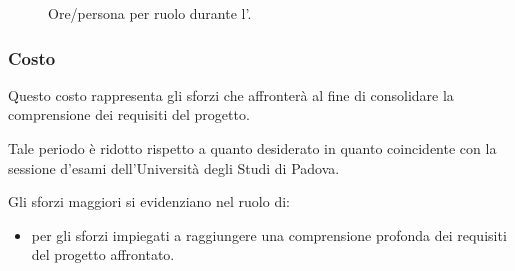 \begin{figure}[H]
\caption{Ore/persona per ruolo durante l'\ARI.}
\label{fig:ari2}

\end{figure}

\pagebreak

\subsubsection{Costo \ARI}

\introcosto{\ARI}
Questo costo rappresenta gli sforzi che {\hx} affronterà al fine di consolidare la comprensione dei requisiti del progetto.

Tale periodo è ridotto rispetto a quanto desiderato in quanto coincidente con la sessione d'esami dell'Università degli Studi di Padova. %

Gli sforzi maggiori si evidenziano nel ruolo di:
\begin{itemize}
\item {\ANx} per gli sforzi impiegati a raggiungere una comprensione profonda dei requisiti del progetto affrontato.
\end{itemize}

